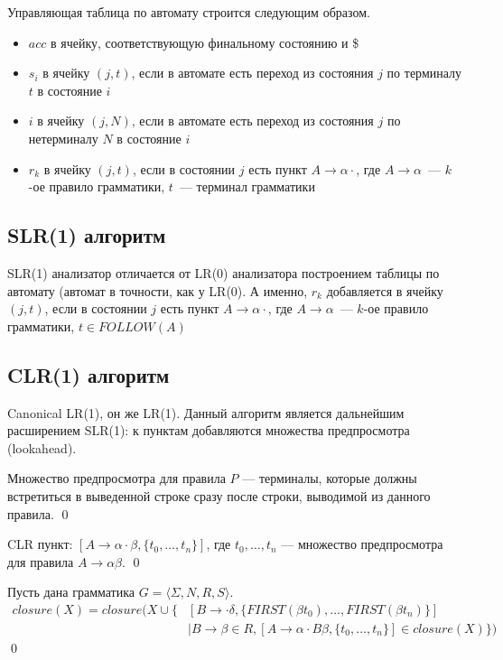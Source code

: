 Управляющая таблица по автомату строится следующим образом.

\begin{itemize}
    \item $acc$ в ячейку, соответствующую финальному состоянию и \$
    \item $s_i$ в ячейку $(j,t)$, если в автомате есть переход из состояния $j$ по терминалу $t$ в состояние $i$
    \item $i$ в ячейку $(j, N)$, если в автомате есть переход из состояния $j$ по нетерминалу $N$ в состояние $i$
    \item $r_k$ в ячейку $(j,t)$, если в состоянии $j$ есть пункт $A \to \alpha \cdot$, где $A \to \alpha$~--- $k$-ое правило грамматики, $t$~--- терминал грамматики
  \end{itemize}

\subsection{SLR(1) алгоритм}

SLR(1) анализатор отличается от LR(0) анализатора построением таблицы по автомату (автомат в точности, как у LR(0).
А именно, $r_k$ добавляется в ячейку $(j,t)$, если в состоянии $j$ есть пункт $A \to \alpha \cdot$, где $A \to \alpha$~--- $k$-ое правило грамматики, $t \in FOLLOW(A)$

\subsection{CLR(1) алгоритм}

Canonical LR(1), он же LR(1).
Данный алгоритм является дальнейшим расширением SLR(1): к пунктам добавляются множества предпросмотра (lookahead).

\begin{definition}
Множество предпросмотра для правила $P$ --- терминалы, которые должны встретиться в выведенной строке сразу после строки, выводимой из данного правила.
\qed
\end{definition}

\begin{definition}
CLR пункт: $ [A \to \alpha \cdot \beta, \{ t_0, \dots, t_n\}] $,
где $t_0, \dots, t_n$ --- множество предпросмотра для правила $A \to \alpha \beta$.
\qed
\end{definition}


\begin{definition}
Пусть дана грамматика $G = \langle \Sigma, N, R, S\rangle$.
\begin{align*}
 closure(X) = closure(X \cup \{&[B \to \cdot \delta, \{FIRST(\beta t_0), \dots, FIRST(\beta t_n)\}] \\
                               &\mid B \to \beta \in R, [A \to \alpha \cdot B \beta, \{t_0, \dots, t_n\}] \in closure(X)\})
\end{align*}
\qed
\end{definition}

